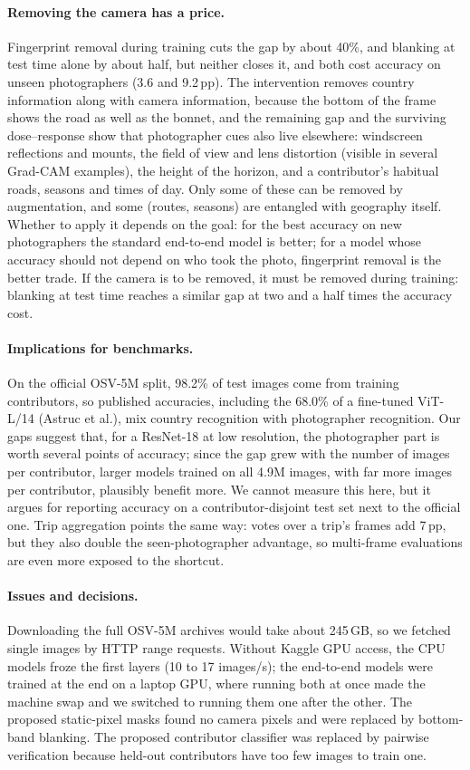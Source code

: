 \documentclass[clean,twocolumn]{bam-project}
\newcommand{\pp}{\,pp}
\begin{document}
\paragraph{Removing the camera has a price.} Fingerprint removal during training cuts the gap by about
40\%, and blanking at test time alone by about half, but neither closes it, and both cost accuracy on
unseen photographers (3.6 and 9.2\pp). The intervention removes country information along with camera
information, because the bottom of the frame shows the road as well as the bonnet, and the remaining gap
and the surviving dose--response show that photographer cues also live elsewhere: windscreen reflections
and mounts, the field of view and lens distortion (visible in several Grad-CAM examples), the height of the
horizon, and a contributor's habitual roads, seasons and times of day. Only some of these can be removed
by augmentation, and some (routes, seasons) are entangled with geography itself. Whether to apply it
depends on the goal: for the best accuracy on new photographers the standard end-to-end model is better;
for a model whose accuracy should not depend on who took the photo, fingerprint removal is the better
trade. If the camera is to be removed, it must be removed during training: blanking at test time reaches
a similar gap at two and a half times the accuracy cost.

\paragraph{Implications for benchmarks.} On the official OSV-5M split, 98.2\% of test images come from
training contributors, so published accuracies, including the 68.0\% of a fine-tuned ViT-L/14 (Astruc et
al.), mix country recognition with photographer recognition. Our gaps suggest that, for a ResNet-18 at low
resolution, the photographer part is worth several points of accuracy; since the gap grew with the number
of images per contributor, larger models trained on all 4.9M images, with far more images per
contributor, plausibly benefit more. We cannot measure this here, but it argues for reporting accuracy on
a contributor-disjoint test set next to the official one. Trip aggregation points the same way: votes over
a trip's frames add 7\pp, but they also double the seen-photographer advantage, so multi-frame evaluations
are even more exposed to the shortcut.

\paragraph{Issues and decisions.} Downloading the full OSV-5M archives would take about 245\,GB, so we
fetched single images by HTTP range requests. Without Kaggle GPU access, the CPU models froze the first
layers (10 to 17 images/s); the end-to-end models were trained at the end on a laptop GPU, where running
both at once made the machine swap and we switched to running them one after the other. The proposed
static-pixel masks found no camera pixels and were replaced by bottom-band blanking. The proposed
contributor classifier was replaced by pairwise verification because held-out contributors have too few
images to train one.
\end{document}
